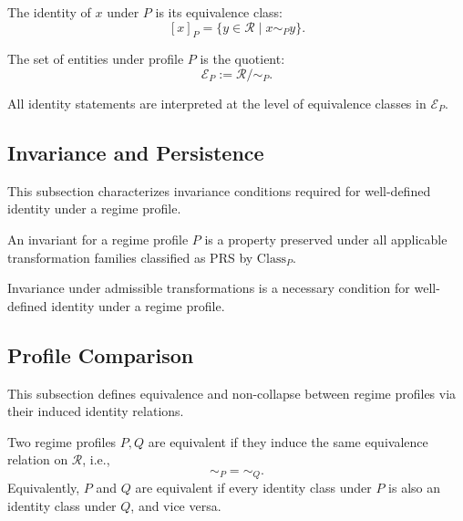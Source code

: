 \begin{definition}
  \label{def:equivalence_class}
  The identity of $x$ under $P$ is its equivalence class:
  \[
    [x]_P = \{ y \in \mathcal{R} \mid x \sim_P y \}.
  \]
\end{definition}

\begin{definition}
  \label{def:quotient_structure}
  The set of entities under profile $P$ is the quotient:
  \[
    \mathcal{E}_P := \mathcal{R} / \sim_P.
  \]
\end{definition}


  All identity statements are interpreted at the level of equivalence classes in $\mathcal{E}_P$.


\subsection{Invariance and Persistence}
\label{subsec:invariance_persistence}

This subsection characterizes invariance conditions
required for well-defined identity under a regime profile.

\begin{definition}[Invariant]
  \label{def:invariant}
  An invariant for a regime profile $P$ is a property preserved under all
  applicable transformation families classified as
  PRS by $\mathrm{Class}_P$.
\end{definition}


  Invariance under admissible transformations is a necessary condition
  for well-defined identity under a regime profile.



\subsection{Profile Comparison}
\label{subsec:profile_comparison}

This subsection defines equivalence and non-collapse
between regime profiles via their induced identity relations.

\begin{definition}
  \label{def:profile_equivalence}
  Two regime profiles $P, Q$ are equivalent if they induce the same
  equivalence relation on $\mathcal{R}$, i.e.,
  \[
    \sim_P = \sim_Q.
  \]
  Equivalently, $P$ and $Q$ are equivalent if every identity class under $P$
  is also an identity class under $Q$, and vice versa.
\end{definition}


